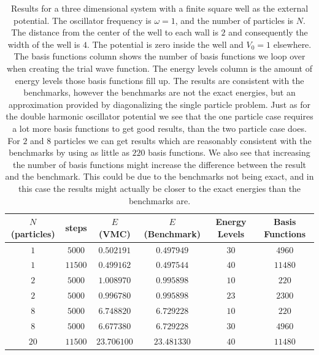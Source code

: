 \documentclass[../main.tex]{subfiles}
\begin{document}
\begin{table}[!ht]
  \centering
  \begin{tabular}{ | c | c | c | c | c | c | }
    \hline
    $N$ (particles) & steps & $E$ (VMC) & $E$ (Benchmark) &  Energy Levels & Basis Functions\\*
    \hline
    $1$ & $5000$ & $0.502191$ & $0.497949$ & $30$ & $4960$ \\*
    \hline
    $1$ & $11500$ & $0.499162$ & $0.497544$ & $40$ & $11480$ \\*
    \hline
    $2$ & $5000$ & $1.008970$ & $0.995898$ & $10$ & $220$ \\*
    \hline
    $2$ & $5000$ & $0.996780$ & $0.995898$ & $23$ & $2300$ \\*
    \hline
    $8$ & $5000$ & $6.748820$ & $6.729228$ & $10$ & $220$ \\*
    \hline
    $8$ & $5000$ & $6.677380$ & $6.729228$ & $30$ & $4960$ \\*
    \hline
    $20$ & $11500$ & $23.706100$ & $23.481330$ & $40$ & $11480$ \\*
    \hline
  \end{tabular}
  \caption{Results for a three dimensional system with a finite square well as the external potential. The oscillator frequency is $\omega = 1$, and the number of particles is $N$. The distance from the center of the well to each wall is $2$ and consequently the width of the well is $4$. The potential is zero inside the well and $V_0 = 1$ elsewhere. The basis functions column shows the number of basis functions we loop over when creating the trial wave function. The energy levels column is the amount of energy levels those basis functions fill up. The results are consistent with the benchmarks, however the benchmarks are not the exact energies, but an approximation provided by diagonalizing the single particle problem. Just as for the double harmonic oscillator potential we see that the one particle case requires a lot more basis functions to get good results, than the two particle case does. For $2$ and $8$ particles we can get results which are reasonably consistent with the benchmarks by using as little as $220$ basis functions. We also see that increasing the number of basis functions might increase the difference between the result and the benchmark. This could be due to the benchmarks not being exact, and in this case the results might actually be closer to the exact energies than the benchmarks are.}
  \label{tab:SquareWellTest3D}
\end{table}
\end{document}

